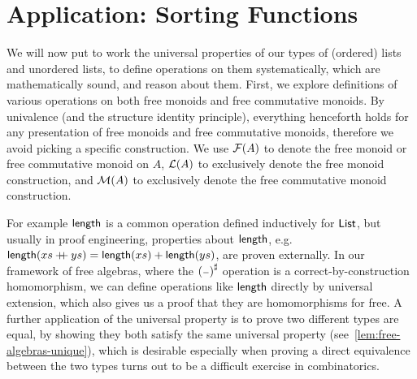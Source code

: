 \section{Application: Sorting Functions}
\label{sec:application}

We will now put to work the universal properties of our types of (ordered) lists and unordered lists,
to define operations on them systematically, which are mathematically sound, and reason about them.
%
First, we explore definitions of various operations on both free monoids and free commutative monoids.
%
%
By univalence (and the structure identity principle), everything henceforth holds for any presentation of free monoids
and free commutative monoids, therefore we avoid picking a specific construction.
%
We use $\mathcal{F}(A)$ to denote the free monoid or free commutative monoid on $A$, $\mathcal{L}(A)$ to exclusively denote the free
monoid construction, and $\mathcal{M}(A)$ to exclusively denote the free commutative monoid construction.

%
For example $\operatorname{\mathsf{length}}$ is a common operation defined inductively for $\operatorname{\mathsf{List}}$,
but usually in proof engineering, properties about $\operatorname{\mathsf{length}}$, e.g.
$\operatorname{\mathsf{length}}(xs \mathbin{+\kern -0.4em+} ys) = \operatorname{\mathsf{length}}(xs) + \operatorname{\mathsf{length}}(ys)$,
are proven externally.
%
In our framework of free algebras, where the $\ext{(\blank)}$ operation is a correct-by-construction homomorphism,
we can define operations like $\operatorname{\mathsf{length}}$ directly by universal extension,
which also gives us a proof that they are homomorphisms for free.
%
A further application of the universal property is to prove two different types are equal, by showing they both satisfy
the same universal property (see~\cref{lem:free-algebras-unique}), which is desirable especially when proving a direct
equivalence between the two types turns out to be a difficult exercise in combinatorics.

